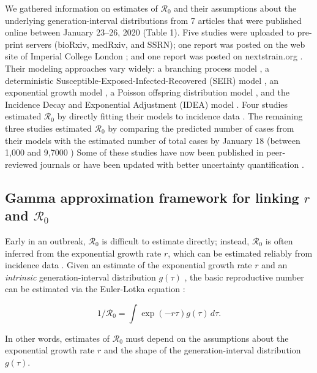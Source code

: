 \documentclass[12pt]{article}
\newcommand{\Ro}{\ensuremath{{\mathcal R}_{0}}\xspace}
\begin{document}
We gathered information on estimates of \Ro and their assumptions about the underlying generation-interval distributions from 7 articles that were published online between January 23--26, 2020 (Table 1).
Five studies \cite{liuncov, majumderncov, readncov, riouncov, zhaoncov} were uploaded to pre-print servers (bioRxiv, medRxiv, and SSRN); one report was posted on the web site of Imperial College London \cite{imaincov}; and one report was posted on nextstrain.org \cite{bedfordncov}.
Their modeling approaches vary widely: a branching process model \cite{bedfordncov, imaincov, riouncov}, a deterministic Susceptible-Exposed-Infected-Recovered (SEIR) model \cite{readncov}, an exponential growth model \cite{zhaoncov}, a Poisson offspring distribution model \cite{liuncov}, and the Incidence Decay and Exponential Adjustment (IDEA) model \cite{majumderncov}.
Four studies estimated \Ro by directly fitting their models to incidence data \cite{readncov, zhaoncov, liuncov, majumderncov}.
The remaining three studies estimated \Ro by comparing the predicted number of cases from their models with the estimated number of total cases by January 18 (between 1,000 and 9,7000 \cite{imaincov0})
Some of these studies have now been published in peer-reviewed journals \cite{riou2020pattern, zhao2020preliminary} or have been updated with better uncertainty quantification \cite{readncov2}.

\subsection{Gamma approximation framework for linking $r$ and $\Ro$}

Early in an outbreak, \Ro is difficult to estimate directly;
instead, \Ro is often inferred from the exponential growth rate $r$, which can be estimated reliably from incidence data \cite{ma2014estimating}.
Given an estimate of the exponential growth rate $r$ and an \emph{intrinsic} generation-interval distribution $g(\tau)$ \cite{champredon2015intrinsic}, the basic reproductive
number can be estimated via the Euler-Lotka equation \cite{wallinga2007generation}:
\begin{linenomath*}
\begin{equation}
1/\Ro = \int \exp(-r\tau) g(\tau) \, d\tau.
\label{eq:euler}
\end{equation}
\end{linenomath*}
In other words, estimates of \Ro must
depend on the assumptions about the
exponential growth rate $r$ and the shape of the generation-interval distribution $g(\tau)$.
\end{document}
